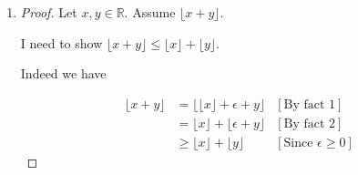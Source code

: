 \documentclass[12pt]{article}
\begin{document}
\begin{enumerate}[1.]
    \item
    \setcounter{equation}{0}
    \begin{proof}

    Let $x,y \in \mathbb{R}$. Assume $\lfloor x + y \rfloor$.

    \bigskip

    I need to show $\lfloor x + y \rfloor \leq \lfloor x \rfloor + \lfloor y \rfloor$.

    \bigskip

    Indeed we have

    \begin{align}
        \lfloor x + y \rfloor &= \lfloor \lfloor x \rfloor + \epsilon + y \rfloor & [\text{By fact 1}]\\
        &= \lfloor x \rfloor + \lfloor \epsilon + y \rfloor & [\text{By fact 2}]\\
        &\geq \lfloor x \rfloor + \lfloor y \rfloor & [\text{Since $\epsilon \geq 0$}]
    \end{align}
    \end{proof}
\end{enumerate}
\end{document}
